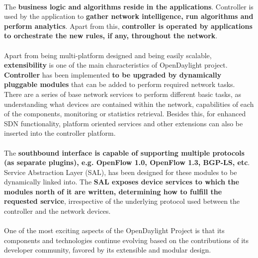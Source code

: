\documentclass[a4paper, 12pt]{book}
\begin{document}
\\
The \textbf{business logic and algorithms reside in the applications}. Controller is used by the application to \textbf{gather network intelligence, run algorithms and perform analytics}. Apart from this, \textbf{controller is operated by applications to orchestrate the new rules, if any, throughout the network}.\\
\\
Apart from being multi-platform designed and being easily scalable, \textbf{extensibility} is one of the main characteristics of OpenDaylight project. \textbf{Controller} has been implemented \textbf{to be upgraded by dynamically pluggable modules} that can be added to perform required network tasks. There are a series of base network services to perform different basic tasks, as understanding what devices are contained within the network, capabilities of each of the components, monitoring or statistics retrieval. Besides this, for enhanced SDN functionality, platform oriented services and other extensions can also be inserted into the controller platform.\\
\\
The \textbf{southbound interface is capable of supporting multiple protocols (as separate plugins), e.g. OpenFlow 1.0, OpenFlow 1.3, BGP-LS, etc}. Service Abstraction Layer (SAL), has been designed for these modules to be dynamically linked into. The \textbf{SAL exposes device services to which the modules north of it are written, determining how to fulfill the requested service}, irrespective of the underlying protocol used between the controller and the network devices.\\
\\
One of the most exciting aspects of the OpenDaylight Project is that its components and technologies continue evolving based on the contributions of its developer community, favored by its extensible and modular design.
\end{document}
